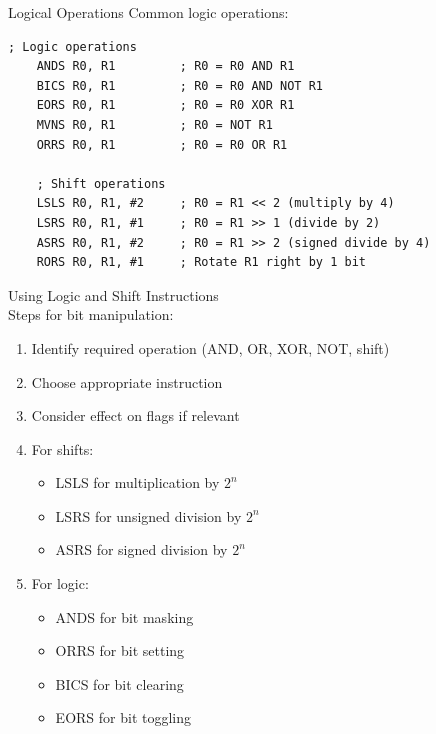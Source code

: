 \begin{example2}{Logical Operations}
Common logic operations:
\begin{lstlisting}[language=armasm, style=basesmol]
    ; Logic operations
    ANDS R0, R1         ; R0 = R0 AND R1
    BICS R0, R1         ; R0 = R0 AND NOT R1
    EORS R0, R1         ; R0 = R0 XOR R1
    MVNS R0, R1         ; R0 = NOT R1
    ORRS R0, R1         ; R0 = R0 OR R1
    
    ; Shift operations
    LSLS R0, R1, #2     ; R0 = R1 << 2 (multiply by 4)
    LSRS R0, R1, #1     ; R0 = R1 >> 1 (divide by 2)
    ASRS R0, R1, #2     ; R0 = R1 >> 2 (signed divide by 4)
    RORS R0, R1, #1     ; Rotate R1 right by 1 bit
\end{lstlisting}
\end{example2}

\begin{KR}{Using Logic and Shift Instructions}\\
Steps for bit manipulation:
\begin{enumerate}
  \item Identify required operation (AND, OR, XOR, NOT, shift)
  \item Choose appropriate instruction
  \item Consider effect on flags if relevant
  \item For shifts:
    \begin{itemize}
      \item LSLS for multiplication by $2^n$
      \item LSRS for unsigned division by $2^n$
      \item ASRS for signed division by $2^n$
    \end{itemize}
  \item For logic:
    \begin{itemize}
      \item ANDS for bit masking
      \item ORRS for bit setting
      \item BICS for bit clearing
      \item EORS for bit toggling
    \end{itemize}
\end{enumerate}
\end{KR}

